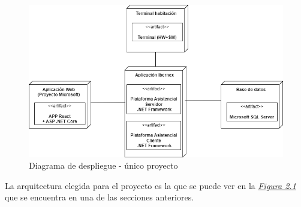 \begin{figure}[!h]
    \centering
    \includegraphics[width=15cm]{Imagenes/Arquitectura-despliegue-3}
    \caption{Diagrama de despliegue - único proyecto}
    \label{fig:despliegue-3}
\end{figure}


La arquitectura elegida para el proyecto es la que se puede ver en la \hyperref[fig:despliegue]{\textit{Figura 2.1}} que se encuentra en una de las secciones anteriores.



